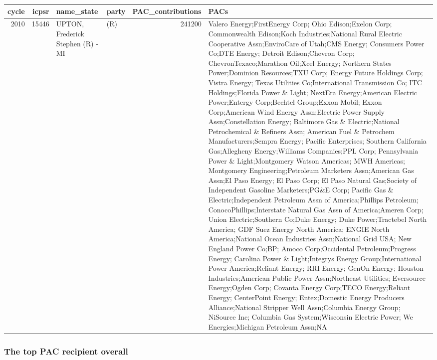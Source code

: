 \documentclass[]{article}
\begin{document}
\begin{longtable}[]{@{}rrllrl@{}}
\toprule
cycle & icpsr & name\_state & party & PAC\_contributions &
PACs\tabularnewline
\midrule
\endhead
2010 & 15446 & UPTON, Frederick Stephen (R) - MI & (R) & 241200 & Valero
Energy;FirstEnergy Corp; Ohio Edison;Exelon Corp; Commonwealth
Edison;Koch Industries;National Rural Electric Cooperative
Assn;EnviroCare of Utah;CMS Energy; Consumers Power Co;DTE Energy;
Detroit Edison;Chevron Corp; ChevronTexaco;Marathon Oil;Xcel Energy;
Northern States Power;Dominion Resources;TXU Corp; Energy Future
Holdings Corp; Vistra Energy; Texas Utilities Co;International
Transmission Co; ITC Holdings;Florida Power \& Light; NextEra
Energy;American Electric Power;Entergy Corp;Bechtel Group;Exxon Mobil;
Exxon Corp;American Wind Energy Assn;Electric Power Supply
Assn;Constellation Energy; Baltimore Gas \& Electric;National
Petrochemical \& Refiners Assn; American Fuel \& Petrochem
Manufacturers;Sempra Energy; Pacific Enterprises; Southern California
Gas;Allegheny Energy;Williams Companies;PPL Corp; Pennsylvania Power \&
Light;Montgomery Watson Americas; MWH Americas; Montgomery
Engineering;Petroleum Marketers Assn;American Gas Assn;El Paso Energy;
El Paso Corp; El Paso Natural Gas;Society of Independent Gasoline
Marketers;PG\&E Corp; Pacific Gas \& Electric;Independent Petroleum Assn
of America;Phillips Petroleum; ConocoPhillips;Interstate Natural Gas
Assn of America;Ameren Corp; Union Electric;Southern Co;Duke Energy;
Duke Power;Tractebel North America; GDF Suez Energy North America; ENGIE
North America;National Ocean Industries Assn;National Grid USA; New
England Power Co;BP; Amoco Corp;Occidental Petroleum;Progress Energy;
Carolina Power \& Light;Integrys Energy Group;International Power
America;Reliant Energy; RRI Energy; GenOn Energy; Houston
Industries;American Public Power Assn;Northeast Utilities; Eversource
Energy;Ogden Corp; Covanta Energy Corp;TECO Energy;Reliant Energy;
CenterPoint Energy; Entex;Domestic Energy Producers Alliance;National
Stripper Well Assn;Columbia Energy Group; NiSource Inc; Columbia Gas
System;Wisconsin Electric Power; We Energies;Michigan Petroleum
Assn;NA\tabularnewline
\bottomrule
\end{longtable}

\subsubsection{The top PAC recipient
overall}\label{the-top-pac-recipient-overall}
\end{document}
